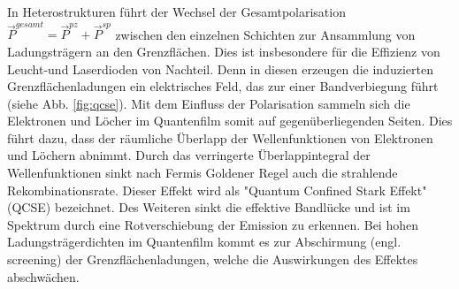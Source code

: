 In Heterostrukturen führt der Wechsel der Gesamtpolarisation $\vec{P}^{gesamt} = \vec{P}^{pz} + \vec{P}^{sp}$ zwischen den einzelnen Schichten zur Ansammlung von Ladungsträgern an den Grenzflächen. Dies ist insbesondere für die Effizienz von Leucht-und Laserdioden von Nachteil. Denn in diesen erzeugen die induzierten Grenzflächenladungen ein elektrisches Feld, das zur einer Bandverbiegung führt (siehe Abb. \ref{fig:qcse}). Mit dem Einfluss der Polarisation sammeln sich die Elektronen und Löcher im Quantenfilm somit auf gegenüberliegenden Seiten. Dies führt dazu, dass der räumliche Überlapp der Wellenfunktionen von Elektronen und Löchern abnimmt. Durch das verringerte Überlappintegral der Wellenfunktionen sinkt nach Fermis Goldener Regel auch die strahlende Rekombinationsrate. Dieser Effekt wird als "Quantum Confined Stark Effekt" (QCSE) \cite{PhysRevLett.53.2173} bezeichnet. Des Weiteren sinkt die effektive Bandlücke und ist im Spektrum durch eine Rotverschiebung der Emission zu erkennen. Bei hohen Ladungsträgerdichten im Quantenfilm kommt es zur Abschirmung (engl. screening) der Grenzflächenladungen, welche die Auswirkungen des Effektes abschwächen.
